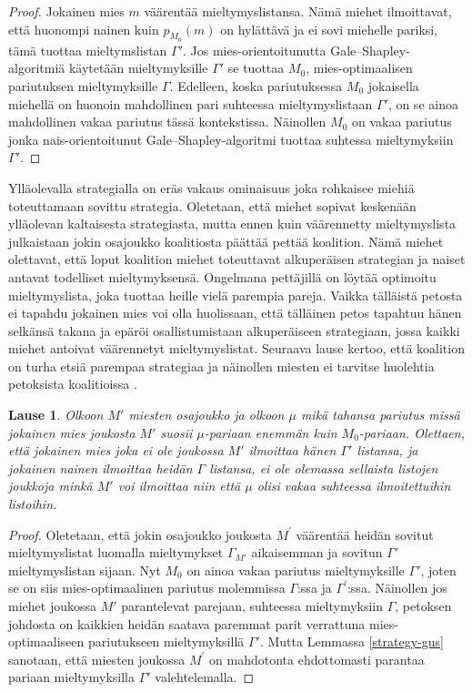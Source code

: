\documentclass[finnish]{tktltiki2}
\newtheorem{lau}{Lause}
\theoremstyle{definition}
\theoremstyle{remark}
\begin{document}
\begin{proof}
	Jokainen mies $m$ väärentää mieltymyslistansa. Nämä miehet ilmoittavat, että huonompi nainen kuin $p_{M_0}(m)$ on hylättävä ja ei sovi miehelle pariksi, tämä tuottaa mieltymslistan $\Gamma'$. Jos mies-orientoitunutta Gale--Shapley-algoritmiä käytetään mieltymyksille $\Gamma'$ se tuottaa $M_0$, mies-optimaalisen pariutuksen mieltymyksille $\Gamma$. Edelleen, koska pariutuksessa $M_0$ jokaisella miehellä on huonoin mahdollinen pari suhteessa mieltymyslistaan $\Gamma'$, on se ainoa mahdollinen vakaa pariutus tässä kontekstissa. Näinollen $M_0$ on vakaa pariutus jonka nais-orientoitunut Gale--Shapley-algoritmi tuottaa suhtessa mieltymyksiin $\Gamma'$.
\end{proof}

Ylläolevalla strategialla on eräs vakaus ominaisuus joka rohkaisee miehiä toteuttamaan sovittu strategia. Oletetaan, että miehet sopivat keskenään ylläolevan kaltaisesta strategiasta, mutta ennen kuin väärennetty mieltymyslista julkaistaan jokin osajoukko koalitiosta päättää pettää koalition. Nämä miehet olettavat, että loput koalition miehet toteuttavat alkuperäisen strategian ja naiset antavat todelliset mieltymyksensä. Ongelmana pettäjillä on löytää optimoitu mieltymyslista, joka tuottaa heille vielä parempia pareja. Vaikka tälläistä petosta ei tapahdu jokainen mies voi olla huolissaan, että tälläinen petos tapahtuu hänen selkänsä takana ja epäröi osallistumistaan alkuperäiseen strategiaan, jossa kaikki miehet antoivat väärennetyt mieltymyslistat. Seuraava lause kertoo, että koalition on turha etsiä parempaa strategiaa ja näinollen miesten ei tarvitse huolehtia petoksista koalitioissa \cite{gusfield1989stable}.

\begin{lau}\cite[p, 58]{gusfield1989stable}
	Olkoon $M'$ miesten osajoukko ja olkoon $\mu$ mikä tahansa pariutus missä jokainen mies joukosta $M'$ suosii $\mu$-pariaan enemmän kuin $M_0$-pariaan. Olettaen, että jokainen mies joka ei ole joukossa $M'$ ilmoittaa hänen $\Gamma'$ listansa, ja jokainen nainen ilmoittaa heidän $\Gamma$ listansa, ei ole olemassa sellaista listojen joukkoja minkä $M'$ voi ilmoittaa niin että $\mu$ olisi vakaa suhteessa ilmoitettuihin listoihin.
\end{lau}

\begin{proof}
	Oletetaan, että jokin osajoukko joukosta $M^{'}$ väärentää heidän sovitut mieltymyslistat luomalla mieltymykset $\Gamma_{M'}$ aikaisemman ja sovitun $\Gamma'$ mieltymyslistan sijaan. Nyt $M_0$ on ainoa vakaa pariutus mieltymyksille $\Gamma'$, joten se on siis mies-optimaalinen pariutus molemmissa $\Gamma$:ssa ja $\Gamma^{'}$:ssa. Näinollen jos miehet joukossa $M'$ parantelevat parejaan, suhteessa mieltymyksiin $\Gamma$, petoksen johdosta on kaikkien heidän saatava paremmat parit verrattuna mies-optimaaliseen pariutukseen mieltymyksillä $\Gamma'$. Mutta Lemmassa \ref{strategy-gus} sanotaan, että miesten joukossa $M^{'}$ on mahdotonta ehdottomasti parantaa pariaan mieltymyksilla $\Gamma'$ valehtelemalla.
\end{proof}
\end{document}
